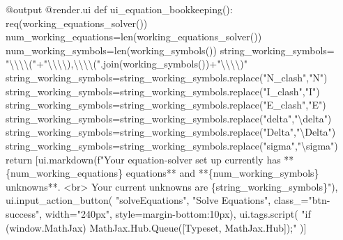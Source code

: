 \documentclass[
  letterpaper,
  DIV=11,
  numbers=noendperiod]{scrreprt}
\newenvironment{Shaded}{\begin{snugshade}}{\end{snugshade}}
\newcommand{\NormalTok}[1]{\textcolor[rgb]{0.00,0.23,0.31}{#1}}
\begin{document}
\begin{Shaded}
\begin{Highlighting}[]
\NormalTok{    @output}
\NormalTok{    @render.ui}
\NormalTok{    def ui\_equation\_bookkeeping():}
\NormalTok{        req(working\_equations\_solver())}
\NormalTok{        num\_working\_equations=len(working\_equations\_solver())}
\NormalTok{        num\_working\_symbols=len(working\_symbols())}
\NormalTok{        string\_working\_symbols= "\textbackslash{}\textbackslash{}\textbackslash{}\textbackslash{}("+"\textbackslash{}\textbackslash{}\textbackslash{}\textbackslash{}),\textbackslash{}\textbackslash{}\textbackslash{}\textbackslash{}(".join(working\_symbols())+"\textbackslash{}\textbackslash{}\textbackslash{}\textbackslash{})"}
\NormalTok{        string\_working\_symbols=string\_working\_symbols.replace("N\_clash","N")}
\NormalTok{        string\_working\_symbols=string\_working\_symbols.replace("I\_clash","I")}
\NormalTok{        string\_working\_symbols=string\_working\_symbols.replace("E\_clash","E")}
\NormalTok{        string\_working\_symbols=string\_working\_symbols.replace("delta","\textbackslash{}delta")}
\NormalTok{        string\_working\_symbols=string\_working\_symbols.replace("Delta","\textbackslash{}Delta")}
\NormalTok{        string\_working\_symbols=string\_working\_symbols.replace("sigma","\textbackslash{}sigma")}
\NormalTok{        return [ui.markdown(f"Your equation{-}solver set up currently has **\{num\_working\_equations\} equations** and **\{num\_working\_symbols\} unknowns**. \textless{}br\textgreater{}  Your current unknowns are \{string\_working\_symbols\}"), }
\NormalTok{                ui.input\_action\_button(}
\NormalTok{                    "solveEquations", "Solve Equations", class\_="btn{-}success", width="240px", style=\textquotesingle{}margin{-}bottom:10px\textquotesingle{}),}
\NormalTok{                ui.tags.script(}
\NormalTok{                "if (window.MathJax) MathJax.Hub.Queue([\textquotesingle{}Typeset\textquotesingle{}, MathJax.Hub]);"}
\NormalTok{                )]}
        

\end{Highlighting}
\end{Shaded}
\end{document}
